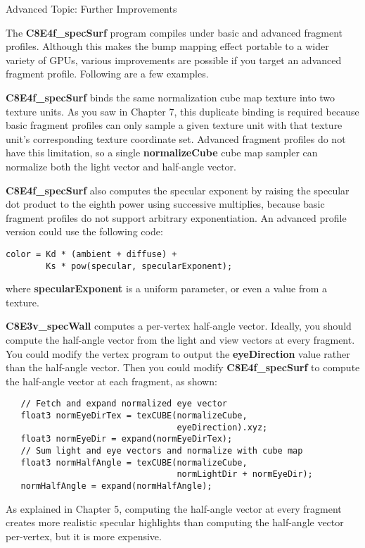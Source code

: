 \documentclass[../main.tex]{subfiles}
\begin{document}
\begin{framed}
Advanced Topic: Further Improvements

The \textbf{C8E4f_specSurf} program compiles under basic and advanced fragment profiles. Although this makes the bump mapping effect portable to a wider variety of GPUs, various improvements are possible if you target an advanced fragment profile. Following are a few examples.

\textbf{C8E4f_specSurf} binds the same normalization cube map texture into two texture units. As you saw in Chapter 7, this duplicate binding is required because basic fragment profiles can only sample a given texture unit with that texture unit's corresponding texture coordinate set. Advanced fragment profiles do not have this limitation, so a single \textbf{normalizeCube} cube map sampler can normalize both the light vector and half-angle vector.

\textbf{C8E4f_specSurf} also computes the specular exponent by raising the specular dot product to the eighth power using successive multiplies, because basic fragment profiles do not support arbitrary exponentiation. An advanced profile version could use the following code:

\FloatBarrier
\begin{lstlisting}
color = Kd * (ambient + diffuse) +
        Ks * pow(specular, specularExponent);
\end{lstlisting}
\FloatBarrier

where \textbf{specularExponent} is a uniform parameter, or even a value from a texture.

\textbf{C8E3v_specWall} computes a per-vertex half-angle vector. Ideally, you should compute the half-angle vector from the light and view vectors at every fragment. You could modify the vertex program to output the \textbf{eyeDirection} value rather than the half-angle vector. Then you could modify \textbf{C8E4f_specSurf} to compute the half-angle vector at each fragment, as shown:

\FloatBarrier
\begin{lstlisting}
   // Fetch and expand normalized eye vector
   float3 normEyeDirTex = texCUBE(normalizeCube,
                                  eyeDirection).xyz;
   float3 normEyeDir = expand(normEyeDirTex);
   // Sum light and eye vectors and normalize with cube map
   float3 normHalfAngle = texCUBE(normalizeCube,
                                  normLightDir + normEyeDir);
   normHalfAngle = expand(normHalfAngle);
\end{lstlisting}
\FloatBarrier

As explained in Chapter 5, computing the half-angle vector at every fragment creates more realistic specular highlights than computing the half-angle vector per-vertex, but it is more expensive.
\end{framed}
\end{document}
